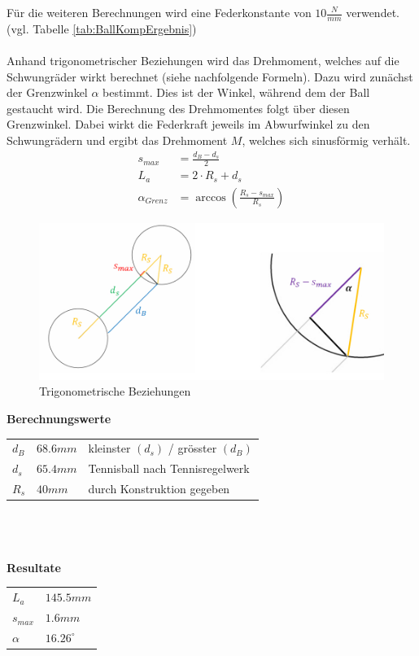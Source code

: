 Für die weiteren Berechnungen wird eine Federkonstante von $10 \frac{N}{mm}$ 
verwendet. (vgl. Tabelle \ref{tab:BallKompErgebnis})\\
\\
Anhand trigonometrischer Beziehungen wird das Drehmoment, welches auf die 
Schwungräder wirkt berechnet (siehe nachfolgende Formeln). Dazu wird zunächst 
der Grenzwinkel $\alpha$ bestimmt. Dies ist der Winkel, während dem der Ball 
gestaucht wird. Die Berechnung des Drehmomentes folgt über diesen Grenzwinkel. 
Dabei wirkt die Federkraft jeweils im Abwurfwinkel zu den Schwungrädern und 
ergibt das Drehmoment $M$, welches sich sinusförmig verhält. 
%
\begin{align}  
    s_{max} &= \frac{d_B - d_s}{2}\\
    L_a &= 2 \cdot R_s + d_s\\
    \alpha_{Grenz} &= \arccos\left(\frac{R_s - s_{max}}{R_s}\right)
\end{align}

\begin{figure}[h!]
	\centering
	\includegraphics[width=1\textwidth]{Enddokumentation/Anhang/Bilder/TrigoBeziehungen.jpg}
	\caption{Trigonometrische Beziehungen}
	\label{fig:trigoBeziehungen}
\end{figure}
\textbf{Berechnungswerte}\\
\begin{tabular}{lll}
	\rule{0pt}{11pt} $d_B$ & $68.6 mm$ & kleinster $(d_s)$ / grösster $(d_B)$ \\
	\rule{0pt}{11pt} $d_s$ & $65.4 mm$ & Tennisball nach Tennisregelwerk \\
	\rule{0pt}{11pt} $R_s$ & $40 mm$ & durch Konstruktion gegeben \\
\end{tabular}\\
\\
\\
\textbf{Resultate}\\
\begin{tabular}{ll}
	\rule{0pt}{11pt} $L_a$ & $145.5 mm$ \\
	\rule{0pt}{11pt} $s_{max}$ & $1.6 mm$ \\
	\rule{0pt}{11pt} $\alpha$ & $16.26^\circ$ \\
\end{tabular}

